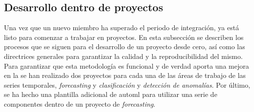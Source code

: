 \subsection{Desarrollo dentro de proyectos}
Una vez que un nuevo miembro ha superado el periodo de integración,
ya está listo para comenzar a trabajar en proyectos. En esta subsección
se describen los procesos que se siguen para el desarrollo de un
proyecto desde cero, así como las directrices generales para
garantizar la calidad y la reproducibilidad del mismo. Para garantizar 
que esta metodología es funcional y de verdad aporta una mejora en la
se han realizado dos proyectos para cada una de las áreas de
trabajo de las series temporales, \textit{forecasting} y \textit{clasificación}
y \textit{detección de anomalías}. Por último, se ha hecho una plantilla
adicional de automl para utilizar una serie de componentes dentro de 
un proyecto de \textit{forecasting}.

